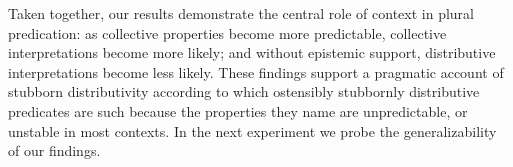 \documentclass[preprint,12pt,authoryear,titlepage]{elsarticle}
\begin{document}
%

Taken together, our results demonstrate the central role of context in plural predication: as collective properties become more predictable, collective interpretations become more likely; and without epistemic support, distributive interpretations become less likely. These findings support a pragmatic account of stubborn distributivity according to which ostensibly stubbornly distributive predicates are such because the properties they name are unpredictable, or unstable in most contexts. In the next experiment we probe the generalizability of our findings.

\end{document}
